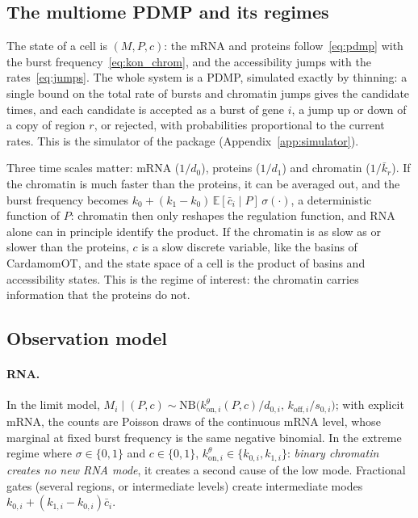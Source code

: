 \documentclass[a4paper, 11pt]{article}
\newcommand{\E}{\mathbb{E}}
\newcommand{\koni}{k_{\mathrm{on},i}^{\theta}}
\newcommand{\cbar}{\bar c}
\theoremstyle{plain}
\theoremstyle{remark}
\begin{document}
\subsection{The multiome PDMP and its regimes}

The state of a cell is $(M, P, c)$: the mRNA and proteins follow~\eqref{eq:pdmp} with the burst frequency~\eqref{eq:kon_chrom}, and the accessibility jumps with the rates~\eqref{eq:jumps}. The whole system is a PDMP, simulated exactly by thinning: a single bound on the total rate of bursts and chromatin jumps gives the candidate times, and each candidate is accepted as a burst of gene $i$, a jump up or down of a copy of region $r$, or rejected, with probabilities proportional to the current rates. This is the simulator of the package (Appendix~\ref{app:simulator}).

Three time scales matter: mRNA ($1/d_0$), proteins ($1/d_1$) and chromatin ($1/\bar k_r$). If the chromatin is much faster than the proteins, it can be averaged out, and the burst frequency becomes $k_0 + (k_1 - k_0)\,\E[\cbar_i \mid P]\,\sigma(\cdot)$, a deterministic function of $P$: chromatin then only reshapes the regulation function, and RNA alone can in principle identify the product. If the chromatin is as slow as or slower than the proteins, $c$ is a slow discrete variable, like the basins of CardamomOT, and the state space of a cell is the product of basins and accessibility states. This is the regime of interest: the chromatin carries information that the proteins do not.

\subsection{Observation model}\label{sec:obs}

\paragraph{RNA.} In the limit model, $M_i \mid (P, c) \sim \mathrm{NB}\bigl(\koni(P,c)/d_{0,i},\, k_{\mathrm{off},i}/s_{0,i}\bigr)$; with explicit mRNA, the counts are Poisson draws of the continuous mRNA level, whose marginal at fixed burst frequency is the same negative binomial. In the extreme regime where $\sigma \in \{0, 1\}$ and $c \in \{0, 1\}$, $\koni \in \{k_{0,i}, k_{1,i}\}$: \emph{binary chromatin creates no new RNA mode}, it creates a second cause of the low mode. Fractional gates (several regions, or intermediate levels) create intermediate modes $k_{0,i} + (k_{1,i} - k_{0,i})\cbar_i$.
\end{document}
